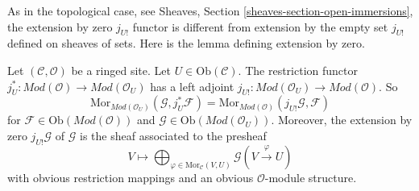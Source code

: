 \noindent
As in the topological case, see
Sheaves, Section \ref{sheaves-section-open-immersions},
the extension by zero $j_{U!}$ functor is different from
extension by the empty set $j_{U!}$ defined on sheaves of sets.
Here is the lemma defining extension by zero.

\begin{lemma}
\label{lemma-extension-by-zero}
Let $(\mathcal{C}, \mathcal{O})$ be a ringed site.
Let $U \in \text{Ob}(\mathcal{C})$.
The restriction functor
$j_U^* : \textit{Mod}(\mathcal{O}) \to \textit{Mod}(\mathcal{O}_U)$
has a left adjoint
$j_{U!} : \textit{Mod}(\mathcal{O}_U) \to \textit{Mod}(\mathcal{O})$.
So
$$
\text{Mor}_{\textit{Mod}(\mathcal{O}_U)}(\mathcal{G}, j_U^*\mathcal{F})
=
\text{Mor}_{\textit{Mod}(\mathcal{O})}(j_{U!}\mathcal{G}, \mathcal{F})
$$
for $\mathcal{F} \in \text{Ob}(\textit{Mod}(\mathcal{O}))$
and $\mathcal{G} \in \text{Ob}(\textit{Mod}(\mathcal{O}_U))$.
Moreover, the extension by zero $j_{U!}\mathcal{G}$ of $\mathcal{G}$
is the sheaf associated to the presheaf
$$
V
\longmapsto
\bigoplus\nolimits_{\varphi \in \text{Mor}_{\mathcal{C}}(V, U)}
\mathcal{G}(V \xrightarrow{\varphi} U)
$$
with obvious restriction mappings and an obvious $\mathcal{O}$-module
structure.
\end{lemma}

